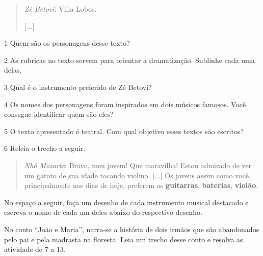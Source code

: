 \begin{boxlist}
\begin{quote}
\emph{Zé Betovi}: Villa Lobos.

{[}...{]}

\end{quote}

\num{1} Quem são os personagens desse texto? 


\num{2} As rubricas no texto servem para orientar a dramatização. Sublinhe cada uma delas.

\num{3} Qual é o instrumento preferido de Zé Betovi? 


\num{4} Os nomes dos personagens foram inspirados em dois músicos famosos. Você
consegue identificar quem são eles? 


\num{5} O texto apresentado é teatral. Com qual objetivo esses textos são
escritos? 



\num{6} Releia o trecho a seguir.

\begin{quote}
\emph{Nhô Mozarte}: Bravo, meu jovem! Que maravilha! Estou admirado de
ver um garoto de sua idade tocando violino. {[}...{]} Os jovens assim
como você, principalmente nos dias de hoje, preferem as
\textbf{guitarras}, \textbf{baterias}, \textbf{violão}.
\end{quote}

No espaço a seguir, faça um desenho de cada instrumento musical
destacado e escreva o nome de cada um deles abaixo do respectivo desenho.

\begin{mdframed}[linewidth=2pt,linecolor=salmao,roundcorner=20pt]
\vspace{10cm}
\end{mdframed}

No conto ``João e Maria'', narra-se a história de dois irmãos que são
abandonados pelo pai e pela madrasta na floresta. Leia um trecho desse
conto e resolva as atividade de 7 a 13.



\end{boxlist}
